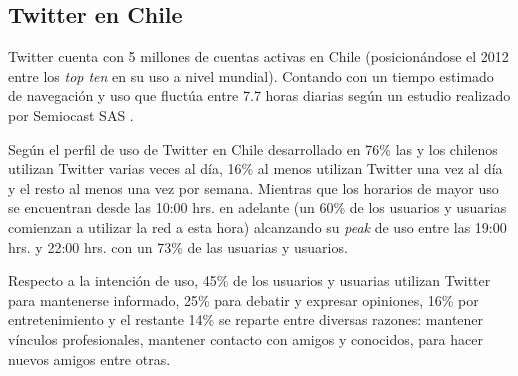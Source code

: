 \subsection{Twitter en Chile}

 Twitter cuenta con 5 millones de cuentas activas en Chile (posicionándose el 2012 entre los \emph{top ten} en su uso a nivel mundial). Contando con un tiempo estimado de navegación y uso que fluctúa entre 7.7 horas diarias según un estudio realizado por Semiocast SAS \cite{rankingChileSemiocast}.

Según el perfil de uso de Twitter en Chile desarrollado en \cite{udpperfiluso} 76\% las y los chilenos utilizan Twitter varias veces al día, 16\% al menos utilizan Twitter una vez al día y el resto al menos una vez por semana. Mientras que los horarios de mayor uso se encuentran desde las 10:00 hrs. en adelante (un 60\% de los usuarios y usuarias comienzan a utilizar la red a esta hora) alcanzando su \emph{peak} de uso entre las 19:00 hrs. y 22:00 hrs. con un 73\% de las usuarias y usuarios.

Respecto a la intención de uso, 45\% de los usuarios y usuarias utilizan Twitter para mantenerse informado, 25\% para debatir y expresar opiniones, 16\% por entretenimiento y el restante 14\% se reparte entre diversas razones: mantener vínculos profesionales, mantener contacto con amigos y conocidos, para hacer nuevos amigos entre otras.